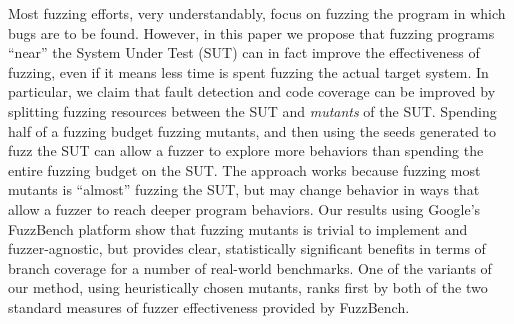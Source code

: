 Most fuzzing efforts, very understandably, focus on fuzzing the program
in which bugs are to be found.  However, in this paper we propose that
fuzzing programs ``near'' the System Under Test (SUT) can in fact
improve the effectiveness of fuzzing, even if it means less time is
spent fuzzing the actual target system.  In particular, we claim that
fault detection and code coverage can be improved by splitting fuzzing
resources between the SUT and \emph{mutants} of the SUT.  Spending
half of a fuzzing budget fuzzing mutants, and then using the seeds
generated to fuzz the SUT can allow a fuzzer to explore more behaviors
than spending the entire fuzzing budget on the SUT.  The approach
works because fuzzing most mutants is ``almost'' fuzzing the SUT, but
may change behavior in ways that allow a fuzzer to reach deeper
program behaviors.  Our results using Google's FuzzBench platform show that fuzzing mutants
is trivial to implement and fuzzer-agnostic, but provides clear, statistically significant
benefits in terms of branch coverage for a number of
real-world benchmarks.  One of the variants of our method, using heuristically
chosen mutants,  ranks first by both of the two standard measures of fuzzer effectiveness
provided by FuzzBench.
